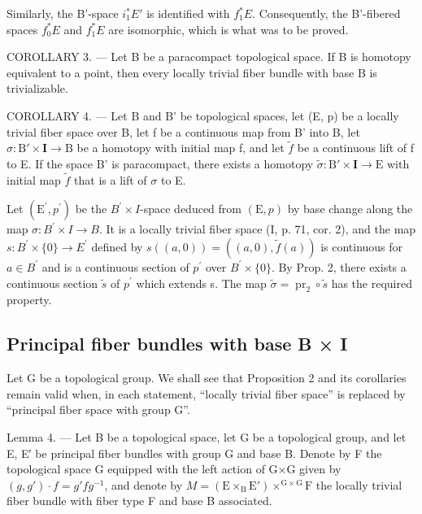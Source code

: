 Similarly, the B'-space \(i_{1}^{*}E'\) is identified with \(f_{1}^{*}E\). Consequently, the B'-fibered spaces \(f_{0}^{*}E\) and \(f_{1}^{*}E\) are isomorphic, which is what was to be proved.

COROLLARY 3. --- Let B be a paracompact topological space. If B is homotopy equivalent to a point, then every locally trivial fiber bundle with base B is trivializable.

COROLLARY 4. --- Let B and B' be topological spaces, let (E, p) be a locally trivial fiber space over B, let f be a continuous map from B' into B, let \(\sigma: \mathrm{B}' \times \mathbf{I} \to \mathrm{B}\) be a homotopy with initial map f, and let \(\widetilde{f}\) be a continuous lift of f to E. If the space B' is paracompact, there exists a homotopy \(\widetilde{\sigma}: \mathrm{B}' \times \mathbf{I} \to \mathrm{E}\) with initial map \(\widetilde{f}\) that is a lift of \(\sigma\) to E.

Let \((\mathrm{E}^{\prime},p^{\prime})\) be the \(B^{\prime}\times I\)-space deduced from \((\mathrm{E},p)\) by base change along the map \(\sigma\colon B^{\prime}\times I\to B\). It is a locally trivial fiber space (I, p. 71, cor. 2), and the map \(s\colon B^{\prime}\times\{0\}\to E^{\prime}\) defined by \(s((a,0))=((a,0),\widetilde{f}(a))\) is continuous for \(a\in B^{\prime}\) and is a continuous section of \(p^{\prime}\) over \(B^{\prime}\times\{0\}\). By Prop. 2, there exists a continuous section \(\widetilde{s}\) of \(p^{\prime}\) which extends s. The map \(\widetilde{\sigma}=\operatorname{pr}_{2}\circ\widetilde{s}\) has the required property.

\subsection{Principal fiber bundles with base B × I}

Let G be a topological group. We shall see that Proposition 2 and its corollaries remain valid when, in each statement, “locally trivial fiber space” is replaced by “principal fiber space with group G”.

Lemma 4. --- Let B be a topological space, let G be a topological group, and let E, E′ be principal fiber bundles with group G and base B. Denote by F the topological space G equipped with the left action of G×G given by \((g,g')\cdot f=g'fg^{-1}\), and denote by \(M = (\mathrm{E}\times_{\mathrm{B}}\mathrm{E}')\times^{\mathrm{G}\times\mathrm{G}}\mathrm{F}\) the locally trivial fiber bundle with fiber type F and base B associated.

